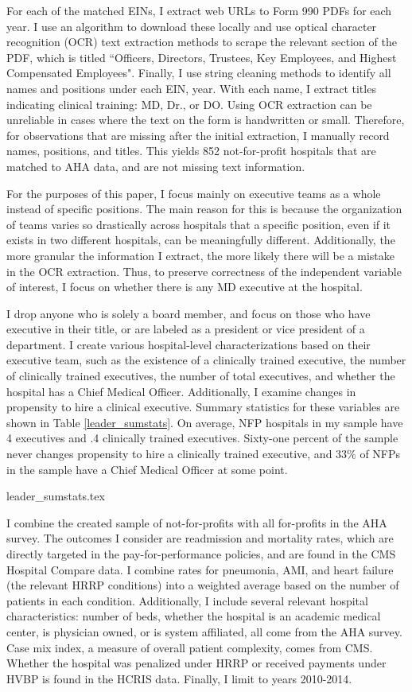 \documentclass[12pt]{article}
\begin{document}
    For each of the matched EINs, I extract web URLs to Form 990 PDFs for each year. I use an algorithm to download these locally and use optical character recognition (OCR) text extraction methods to scrape the relevant section of the PDF, which is titled ``Officers, Directors, Trustees, Key Employees, and Highest Compensated Employees". Finally, I use string cleaning methods to identify all names and positions under each EIN, year. With each name, I extract titles indicating clinical training: MD, Dr., or DO. Using OCR extraction can be unreliable in cases where the text on the form is handwritten or small. Therefore, for observations that are missing after the initial extraction, I manually record names, positions, and titles. This yields 852 not-for-profit hospitals that are matched to AHA data, and are not missing text information. 

    For the purposes of this paper, I focus mainly on executive teams as a whole instead of specific positions. The main reason for this is because the organization of teams varies so drastically across hospitals that a specific position, even if it exists in two different hospitals, can be meaningfully different. Additionally, the more granular the information I extract, the more likely there will be a mistake in the OCR extraction. Thus, to preserve correctness of the independent variable of interest, I focus on whether there is any MD executive at the hospital.
    
    I drop anyone who is solely a board member, and focus on those who have executive in their title, or are labeled as a president or vice president of a department. I create various hospital-level characterizations based on their executive team, such as the existence of a clinically trained executive, the number of clinically trained executives, the number of total executives, and whether the hospital has a Chief Medical Officer. Additionally, I examine changes in propensity to hire a clinical executive. Summary statistics for these variables are shown in Table \ref{leader_sumstats}. On average, NFP hospitals in my sample have 4 executives and .4 clinically trained executives. Sixty-one percent of the sample never changes propensity to hire a clinically trained executive, and 33\% of NFPs in the sample have a Chief Medical Officer at some point. 

    {leader_sumstats.tex}

    I combine the created sample of not-for-profits with all for-profits in the AHA survey. The outcomes I consider are readmission and mortality rates, which are directly targeted in the pay-for-performance policies, and are found in the CMS Hospital Compare data. I combine rates for pneumonia, AMI, and heart failure (the relevant HRRP conditions) into a weighted average based on the number of patients in each condition. Additionally, I include several relevant hospital characteristics: number of beds, whether the hospital is an academic medical center, is physician owned, or is system affiliated, all come from the AHA survey. Case mix index, a measure of overall patient complexity, comes from CMS. Whether the hospital was penalized under HRRP or received payments under HVBP is found in the HCRIS data. Finally, I limit to years 2010-2014.
\end{document}
